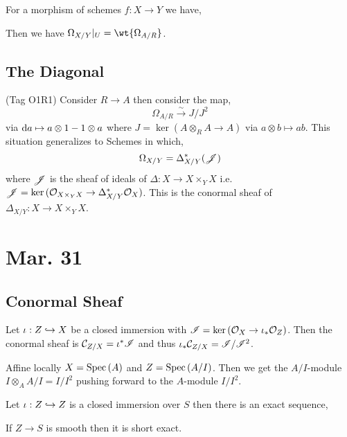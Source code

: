 \documentclass[12pt]{article}
\begin{document}
\begin{lemma}
For a morphism of schemes $f : X \to Y$ we have,
\begin{center}
\end{center}
Then we have $\Omega_{X/Y} |_U = \wt{\Omega_{A/R}}$. 
\end{lemma}

\subsection{The Diagonal}
(Tag O1R1)
Consider $R \to A$ then consider the map,
\[ \Omega_{A/R} \xrightarrow{\sim} J / J^2 \]
via $\mathrm{d}{a} \mapsto a \otimes 1 - 1 \otimes a$ where $J = \ker{(A \otimes_R A \to A)}$ via $a \otimes b \mapsto ab$. This situation generalizes to Schemes in which,
\[ \Omega_{X/Y} = \Delta_{X/Y}^*(\mathscr{J}) \]
where $\mathscr{J}$ is the sheaf of ideals of $\Delta : X \to X \times_Y X$ i.e. $\mathscr{J} = \ker{(\mathcal{O}_{X \times_Y X} \to \Delta_{X/Y}^* \mathcal{O}_{X})}$. This is the conormal sheaf of $\Delta_{X/Y} : X \to X \times_Y X$. 

\section{Mar. 31}

\subsection{Conormal Sheaf}

\begin{defn}
Let $\iota : Z \hookrightarrow X$ be a closed immersion with $\mathscr{I} = \ker{(\mathcal{O}_{X} \to \iota_* \mathcal{O}_{Z})}$. Then the conormal sheaf is $\mathcal{C}_{Z/X} = \iota^* \mathscr{I}$ and thus $\iota_* \mathcal{C}_{Z/X} = \mathscr{I} / \mathscr{I}^2$.
\end{defn}

\begin{rmk}
Affine locally $X = \mathrm{Spec}\left( A \right)$ and $Z = \mathrm{Spec}\left( A/I \right)$. Then we get the $A/I$-module $I \otimes_A A/I = I/I^2$ pushing forward to the $A$-module $I/I^2$.
\end{rmk}

\begin{prop}
Let $\iota : Z \hookrightarrow Z$ is a closed immersion over $S$ then there is an exact sequence,
\begin{center}
\end{center}
If $Z \to S$ is smooth then it is short exact.
\end{prop}
\end{document}
